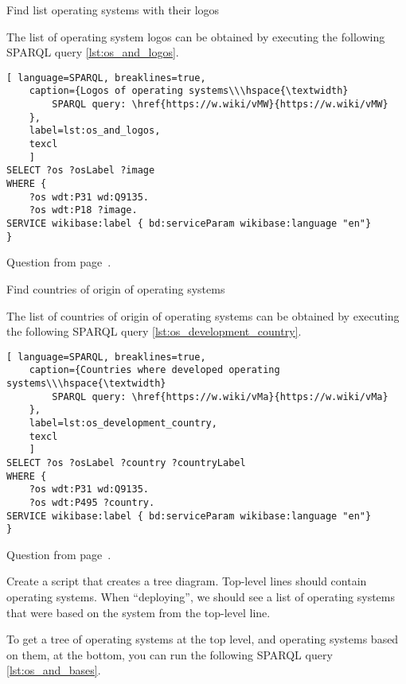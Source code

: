 \begin{exercise}
	\label{answer:os_and_logos}
	Find list operating systems with their logos
\end{exercise}
The list of operating system logos can be obtained by executing the following SPARQL query \ref{lst:os_and_logos}.

\begin{lstlisting}[ language=SPARQL, breaklines=true, 
	caption={Logos of operating systems\\\hspace{\textwidth}
		SPARQL query: \href{https://w.wiki/vMW}{https://w.wiki/vMW}
	},
	label=lst:os_and_logos,
	texcl 
	]
SELECT ?os ?osLabel ?image 
WHERE {
	?os wdt:P31 wd:Q9135.
	?os wdt:P18 ?image.
SERVICE wikibase:label { bd:serviceParam wikibase:language "en"}
}
\end{lstlisting}

Question from page~\pageref{tasks:operating_system_tasks}.

\begin{exercise}
	\label{answer:os_country}
	Find countries of origin of operating systems
\end{exercise}
The list of countries of origin of operating systems can be obtained by executing the following SPARQL query \ref{lst:os_development_country}.

\begin{lstlisting}[ language=SPARQL, breaklines=true, 
	caption={Countries where developed operating systems\\\hspace{\textwidth}
		SPARQL query: \href{https://w.wiki/vMa}{https://w.wiki/vMa}
	},
	label=lst:os_development_country,
	texcl 
	]
SELECT ?os ?osLabel ?country ?countryLabel
WHERE {
	?os wdt:P31 wd:Q9135.
	?os wdt:P495 ?country.
SERVICE wikibase:label { bd:serviceParam wikibase:language "en"}
}
\end{lstlisting}

Question from page~\pageref{tasks:operating_system_tasks}.

\begin{exercise}
	\label{answer:os_and_bases}
	Create a script that creates a tree diagram. Top-level lines should contain operating systems. When ``deploying'', we should see a list of operating systems that were based on the system from the top-level line.
\end{exercise}
To get a tree of operating systems at the top level, and operating systems based on them, at the bottom, you can run the following SPARQL query \ref{lst:os_and_bases}.

